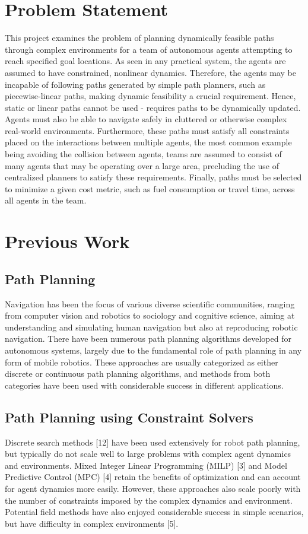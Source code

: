 \documentclass[a4paper]{article}
\begin{document}
\section{Problem Statement}
\label{sec:Problem Statement}
This project examines the problem of planning dynamically feasible paths through complex environments for a team of autonomous agents attempting to reach specified goal locations. As seen in any practical system, the agents are assumed to have constrained, nonlinear dynamics. Therefore, the agents may be incapable of following paths generated by simple path planners, such as piecewise-linear paths, making dynamic feasibility a crucial requirement. Hence, static or linear paths cannot be used - requires paths to be dynamically updated. Agents must also be able to navigate safely in cluttered or otherwise complex real-world environments. Furthermore, these paths must satisfy all constraints placed on the interactions between multiple agents, the most common example being avoiding the collision between agents, teams are assumed to consist of many agents that may be operating over a large area, precluding the use of centralized planners to satisfy these requirements. Finally, paths must be selected to minimize a given cost metric, such as fuel consumption or travel time, across all agents in the team.




\section{Previous Work}
\subsection{Path Planning}
Navigation has been the focus of various diverse scientific communities, ranging from computer vision and robotics to sociology and cognitive science, aiming at understanding and simulating human navigation but also at reproducing robotic navigation. There have been numerous path planning algorithms developed for autonomous systems, largely due to the fundamental role of path planning in any form of mobile robotics. These approaches are usually categorized as either discrete or continuous path planning algorithms, and methods from both categories have been used with considerable success in different applications.



\subsection{Path Planning using Constraint Solvers}
Discrete search methods [12] have been used extensively for robot path planning, but typically do not scale well to large problems with complex agent dynamics and environments. Mixed Integer Linear Programming (MILP) [3] and Model Predictive Control (MPC) [4] retain the benefits of optimization and can account for agent dynamics more easily. However, these approaches also scale poorly with the number of constraints imposed by the complex dynamics and environment. Potential field methods have also enjoyed considerable success in simple scenarios, but have difficulty in complex environments [5].
\end{document}
